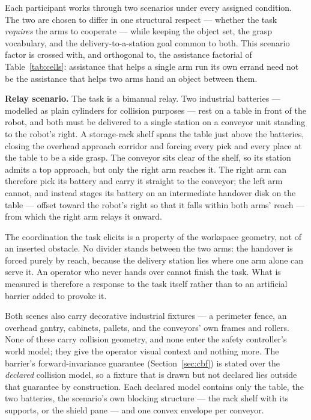 \documentclass[12pt,a4paper,twoside,openright]{report}
\begin{document}
Each participant works through two scenarios under every assigned condition. The two are chosen to differ in one structural respect --- whether the task \emph{requires} the arms to cooperate --- while keeping the object set, the grasp vocabulary, and the delivery-to-a-station goal common to both. This scenario factor is crossed with, and orthogonal to, the assistance factorial of Table~\ref{tab:cells}: assistance that helps a single arm run its own errand need not be the assistance that helps two arms hand an object between them.

\textbf{Relay scenario.} The task is a bimanual relay. Two industrial batteries --- modelled as plain cylinders for collision purposes --- rest on a table in front of the robot, and both must be delivered to a single station on a conveyor unit standing to the robot's right. A storage-rack shelf spans the table just above the batteries, closing the overhead approach corridor and forcing every pick and every place at the table to be a side grasp. The conveyor sits clear of the shelf, so its station admits a top approach, but only the right arm reaches it. The right arm can therefore pick its battery and carry it straight to the conveyor; the left arm cannot, and instead stages its battery on an intermediate handover disk on the table --- offset toward the robot's right so that it falls within both arms' reach --- from which the right arm relays it onward.

The coordination the task elicits is a property of the workspace geometry, not of an inserted obstacle. No divider stands between the two arms: the handover is forced purely by reach, because the delivery station lies where one arm alone can serve it. An operator who never hands over cannot finish the task. What is measured is therefore a response to the task itself rather than to an artificial barrier added to provoke it.

Both scenes also carry decorative industrial fixtures --- a perimeter fence, an overhead gantry, cabinets, pallets, and the conveyors' own frames and rollers. None of these carry collision geometry, and none enter the safety controller's world model; they give the operator visual context and nothing more. The barrier's forward-invariance guarantee (Section~\ref{sec:cbf}) is stated over the \emph{declared} collision model, so a fixture that is drawn but not declared lies outside that guarantee by construction. Each declared model contains only the table, the two batteries, the scenario's own blocking structure --- the rack shelf with its supports, or the shield pane --- and one convex envelope per conveyor.
\end{document}
